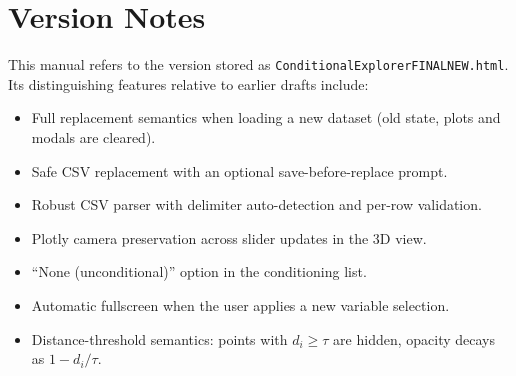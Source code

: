 \documentclass[11pt,a4paper]{article}
\begin{document}
\section*{Version Notes}

This manual refers to the version stored as \texttt{ConditionalExplorerFINALNEW.html}. Its distinguishing features relative to earlier drafts include:

\begin{itemize}[leftmargin=1.4em]
  \item Full replacement semantics when loading a new dataset (old state, plots and modals are cleared).
  \item Safe CSV replacement with an optional save-before-replace prompt.
  \item Robust CSV parser with delimiter auto-detection and per-row validation.
  \item Plotly camera preservation across slider updates in the 3D view.
  \item ``None (unconditional)'' option in the conditioning list.
  \item Automatic fullscreen when the user applies a new variable selection.
  \item Distance-threshold semantics: points with $d_i \ge \tau$ are hidden, opacity decays as $1 - d_i/\tau$.
\end{itemize}
\end{document}
